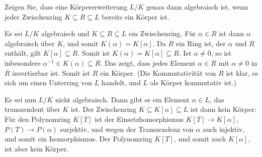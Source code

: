 \begin{question}
  Zeigen Sie, dass eine Körpererweiterung $L/K$ genau dann algebraisch ist, wenn jeder Zwischenring $K \subseteq R \subseteq L$ bereits ein Körper ist.
\end{question}


\begin{solution}
  Es sei $L/K$ algebraisch und $K \subseteq R \subseteq L$ ein Zwischenring.
  Für $\alpha \in R$ ist dann $\alpha$ algebraisch über $K$, und somit $K(\alpha) = K[\alpha]$.
  Da $R$ ein Ring ist, der $\alpha$ und $R$ enthält, gilt $K[\alpha] \subseteq R$.
  Somit ist $K(\alpha) = K[\alpha] \subseteq R$.
  Ist $\alpha \neq 0$, so ist inbesondere $\alpha^{-1} \in K(\alpha) \subseteq R$.
  Das zeigt, dass jedes Element $\alpha \in R$ mit $\alpha \neq 0$ in $R$ invertierbar ist.
  Somit ist $R$ ein Körper.
  (Die Kommutativität von $R$ ist klar, es sich um einen Unterring von $L$ handelt, und $L$ als Körper kommutativ ist.)
  
  Es sei nun $L/K$ nicht algebraisch.
  Dann gibt es ein Element $\alpha \in L$, das transzendent über $K$ ist.
  Der Zwischenring $K \subseteq K[\alpha] \subseteq L$ ist dann kein Körper:
  Für den Polynomring $K[T]$ ist der Einsetzhomorphismus $K[T] \to K[\alpha]$, $P(T) \to P(\alpha)$ surjektiv, und wegen der Transzendenz von $\alpha$ auch injektiv, und somit ein Isomorphismus.
  Der Polynomring $K[T]$, und somit auch $K[\alpha]$, ist aber kein Körper.
\end{solution}




